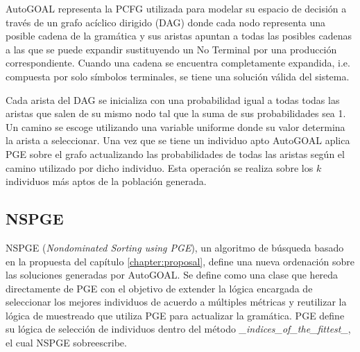 AutoGOAL representa la PCFG utilizada para modelar su espacio de decisi\'on a trav\'es de un grafo ac\'iclico dirigido (DAG) donde cada nodo representa una posible cadena de la gram\'atica y sus aristas apuntan a todas las posibles cadenas a las que se puede expandir sustituyendo un No Terminal por una producci\'on 
correspondiente. Cuando una cadena se encuentra completamente expandida, i.e. compuesta por solo s\'imbolos terminales, se tiene una soluci\'on v\'alida del sistema. 

Cada arista del DAG se inicializa con una probabilidad igual a todas todas las aristas que salen de su mismo nodo tal que la suma de sus probabilidades sea 1. Un camino se escoge utilizando una variable uniforme donde su valor determina la arista a seleccionar.
Una vez que se tiene un individuo apto AutoGOAL aplica PGE sobre el grafo actualizando las probabilidades de todas las aristas seg\'un el camino utilizado por dicho individuo. Esta operaci\'on se realiza sobre los $k$ individuos m\'as aptos de la poblaci\'on generada. %

\subsection{NSPGE}
NSPGE (\textit{Nondominated Sorting using PGE}), un algoritmo de b\'usqueda basado en la propuesta del cap\'itulo \ref{chapter:proposal}, define una nueva ordenaci\'on sobre las soluciones generadas por AutoGOAL. Se define como una clase que hereda directamente de PGE con el objetivo de extender la l\'ogica encargada de seleccionar los mejores individuos de acuerdo a m\'ultiples m\'etricas y reutilizar la l\'ogica de muestreado que utiliza PGE para actualizar la gram\'atica. PGE define su l\'ogica de selecci\'on de individuos dentro del m\'etodo \textit{\_indices\_of\_the\_fittest\_}, el cual NSPGE sobreescribe.

